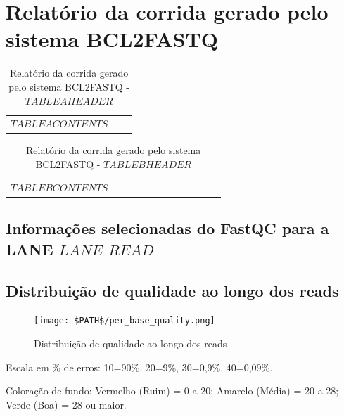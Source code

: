 \documentclass[a4paper]{article}
\begin{document}
\section*{Relatório da corrida gerado pelo sistema BCL2FASTQ}

\begin{table}[!ht]
\centering
\footnotesize
\caption{Relatório da corrida gerado pelo sistema BCL2FASTQ - $TABLEAHEADER$}
\label{TabRelA}
\begin{tabular}{|l|l|l|} \hline
$TABLEACONTENTS$
\end{tabular}
\end{table}

\begin{tiny}
\begin{longtable}{|l|l|l|l|l|l|l|l|l|l|l|l|}
\caption{Relatório da corrida gerado pelo sistema BCL2FASTQ - $TABLEBHEADER$}
\label{TabRelB}
\endfirsthead
\hline
$TABLEBCONTENTS$
\end{longtable}
\end{tiny}


\begin{center}
\section*{Informações selecionadas do FastQC para a LANE $LANE$ $READ$}
\end{center}

\subsection*{Distribuição de qualidade ao longo dos reads}

\begin{figure}[!htbp]
\centering
\texttt{[image: \$PATH\$/per\_base\_quality.png]}
\caption{Distribuição de qualidade ao longo dos reads}
\label{FigQualidadeReads}
\end{figure}

Escala em \% de erros: 10=90\%, 20=9\%, 30=0,9\%, 40=0,09\%.

Coloração de fundo: Vermelho (Ruim) = 0 a 20; Amarelo (Média) = 20 a 28; Verde (Boa) = 28 ou maior.
\end{document}
